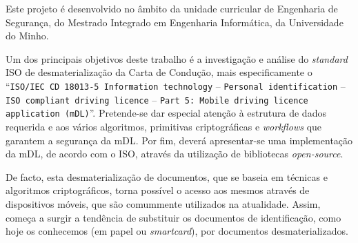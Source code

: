 
Este projeto é desenvolvido no âmbito da unidade curricular de Engenharia de Segurança, do Mestrado Integrado em Engenharia Informática, da Universidade do Minho.

Um dos principais objetivos deste trabalho é a investigação e análise do \textit{standard} ISO de desmaterialização da Carta de Condução, mais especificamente o ``\texttt{ISO/IEC CD 18013-5 Information technology} -- \texttt{Personal identification} -- \texttt{ISO compliant driving licence} -- \texttt{Part 5: Mobile driving licence application (mDL)}''. Pretende-se dar especial atenção à estrutura de dados requerida e aos vários algoritmos, primitivas criptográficas e \textit{workflows} que garantem a segurança da mDL. Por fim, deverá apresentar-se uma implementação da mDL, de acordo com o ISO, através da utilização de bibliotecas \textit{open-source}.

De facto, esta desmaterialização de documentos, que se baseia em técnicas e algoritmos criptográficos, torna possível o acesso aos mesmos através de dispositivos móveis, que são comummente utilizados na atualidade. Assim, começa a surgir a tendência de substituir os documentos de identificação, como hoje os conhecemos (em papel ou \textit{smartcard}), por documentos desmaterializados.
